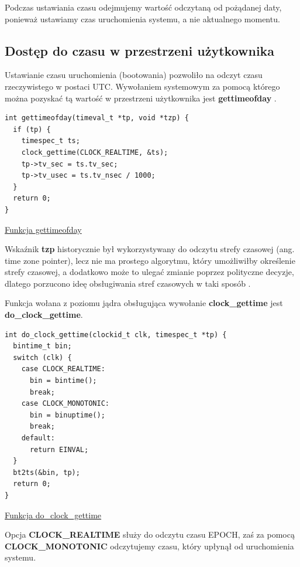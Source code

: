 \documentclass[shortabstract]{iithesis}
\theoremstyle{definition} \newtheorem*{definition}{Definicja}
\theoremstyle{definition} \newtheorem*{example}{Przykład}
\theoremstyle{definition} \newtheorem*{remark}{Uwaga}
\newenvironment{longlisting}{\captionsetup{type=listing}}{}
\begin{document}
Podczas ustawiania czasu odejmujemy wartość odczytaną od pożądanej daty, ponieważ ustawiamy czas uruchomienia systemu, a nie aktualnego momentu.

\subsection{Dostęp do czasu w przestrzeni użytkownika}
Ustawianie czasu uruchomienia (bootowania) pozwoliło na odczyt czasu rzeczywistego w postaci UTC. Wywołaniem systemowym za pomocą którego można pozyskać tą wartość w przestrzeni użytkownika jest \textbf{gettimeofday} \cite{bib:gettime-manual}.
\begin{longlisting}
  \begin{verbatim}
int gettimeofday(timeval_t *tp, void *tzp) {
  if (tp) {
    timespec_t ts;
    clock_gettime(CLOCK_REALTIME, &ts);
    tp->tv_sec = ts.tv_sec;
    tp->tv_usec = ts.tv_nsec / 1000;
  }
  return 0;
}
  \end{verbatim}
  \caption{\href{https://mimiker.ii.uni.wroc.pl/source/xref/mimiker/lib/libc/sys/gettimeofday.c?r=2a3a339e\#3}{Funkcja gettimeofday}}
  \label{lst:funcgettimeofday}
\end{longlisting}

Wskaźnik \textbf{tzp} historycznie był wykorzystywany do odczytu strefy czasowej (ang. time zone pointer), lecz nie ma prostego algorytmu, który umożliwiłby określenie strefy czasowej, a dodatkowo może to ulegać zmianie poprzez polityczne decyzje, dlatego porzucono ideę obsługiwania stref czasowych w taki sposób \cite{bib:gettime-manual}.

Funkcja wołana z poziomu jądra obsługująca wywołanie \textbf{clock\_gettime} \cite{bib:clock_gettime} jest \textbf{do\_clock\_gettime}.

\begin{longlisting}
  \begin{verbatim}
int do_clock_gettime(clockid_t clk, timespec_t *tp) {
  bintime_t bin;
  switch (clk) {
    case CLOCK_REALTIME:
      bin = bintime();
      break;
    case CLOCK_MONOTONIC:
      bin = binuptime();
      break;
    default:
      return EINVAL;
  }
  bt2ts(&bin, tp);
  return 0;
}
  \end{verbatim}
  \caption{\href{https://mimiker.ii.uni.wroc.pl/source/xref/mimiker/sys/kern/time.c?r=9505a819\#11}{Funkcja do\_clock\_gettime}}
  \label{lst:funcdoclockgettime}
\end{longlisting}

Opcja \textbf{CLOCK\_REALTIME} służy do odczytu czasu EPOCH, zaś za pomocą \textbf{CLOCK\_MONOTONIC} odczytujemy czasu, który upłynął od uruchomienia systemu.
\end{document}
